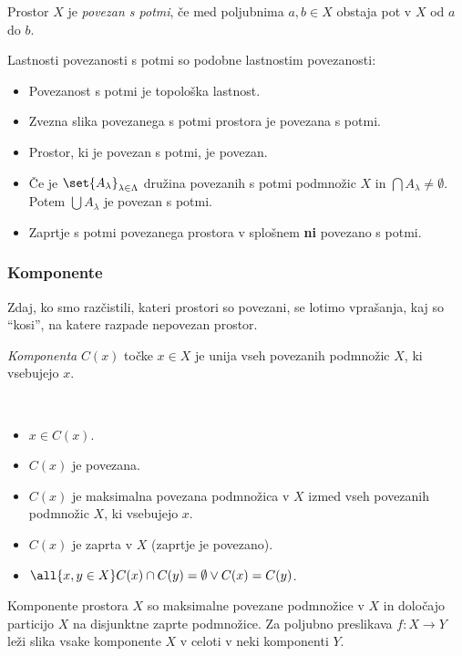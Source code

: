 \begin{definicija}
    Prostor $X$ je \emph{povezan s potmi}, če med poljubnima $a, b \in X$ obstaja pot v $X$ od $a$ do $b$.
\end{definicija}

Lastnosti povezanosti s potmi so podobne lastnostim povezanosti:
\begin{itemize}
    \item Povezanost s potmi je topološka lastnost.
    \item Zvezna slika povezanega s potmi prostora je povezana s potmi.
    \item Prostor, ki je povezan s potmi, je povezan.
    \item Če je $\set{A_\lambda}_{\lambda \in \Lambda}$ družina povezanih s potmi podmnožic $X$ in $\bigcap A_\lambda \neq \emptyset$. Potem $\bigcup A_\lambda$ je povezan s potmi.
    \item Zaprtje s potmi povezanega prostora v splošnem \textbf{ni} povezano s potmi.
\end{itemize}

\subsubsection{Komponente}
Zdaj, ko smo razčistili, kateri prostori so povezani, se lotimo vprašanja, kaj so "`kosi"', na katere razpade nepovezan prostor.

\begin{definicija}
    \emph{Komponenta} $C(x)$ točke $x \in X$ je unija vseh povezanih podmnožic $X$, ki vsebujejo $x$.
\end{definicija}
\begin{opomba}
    \ 
    \begin{itemize}
        \item $x \in C(x)$.
        \item $C(x)$ je povezana.
        \item $C(x)$ je maksimalna povezana podmnožica v $X$ izmed vseh povezanih podmnožic $X$, ki vsebujejo $x$.
        \item $C(x)$ je zaprta v $X$ (zaprtje je povezano).
        \item $\all{x, y \in X} C(x) \cap C(y) = \emptyset \lor C(x) = C(y)$.
    \end{itemize}
\end{opomba}

\begin{izrek}
    Komponente prostora $X$ so maksimalne povezane podmnožice v $X$ in določajo particijo $X$ na disjunktne zaprte podmnožice. Za poljubno preslikava $f: X \to Y$ leži slika vsake komponente $X$ v celoti v neki komponenti $Y$.
\end{izrek}


